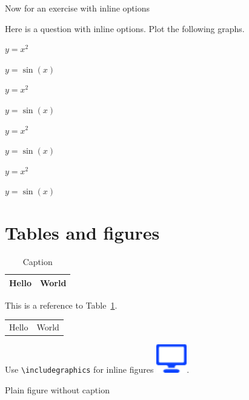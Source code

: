 \documentclass[solutionsatend,twocolumnsolutions]{ouunit}
\begin{document}
Now for an exercise with inline options
\begin{exercise}
Here is a question with inline options. Plot the following graphs.
\begin{enumerate*}
\item $y=x^2$
\item $y=\sin(x)$
\item $y=x^2$
\item $y=\sin(x)$
\item $y=x^2$
\item $y=\sin(x)$
\item $y=x^2$
\item $y=\sin(x)$
\end{enumerate*}
\end{exercise}



\section{Tables and figures}

\lipsum[133]
\begin{table}
\caption{Caption}\label{tab-test}
\begin{tabular}{|l|l|}
\hline
 Hello & World\\
\hline
\end{tabular}
\end{table}

This is a reference to Table~\ref{tab-test}.

\lipsum[133]
\begin{table}
\begin{tabular}{ll}
 Hello & World
\end{tabular}
\end{table}
\lipsum[133]

Use \verb"\includegraphics" for inline figures \includegraphics[height=2ex]{icon}.


Plain figure without caption

\begin{figure}
\end{figure}
\end{document}
